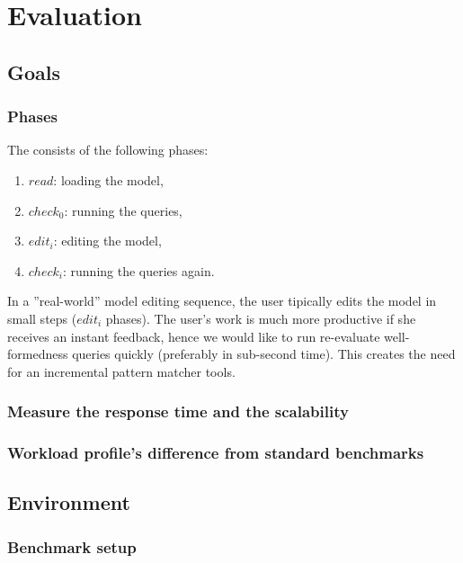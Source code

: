 \chapter{Evaluation}
\label{chap:evaluation}

\section{Goals}


\subsection{Phases}

The \tb{} consists of the following phases:

\begin{enumerate}
  \item $\mathit{read}$: loading the model,
  \item $\mathit{check}_0$: running the queries,
  \item $\mathit{edit}_i$: editing the model, 
  \item $\mathit{check}_i$: running the queries again.
\end{enumerate}

In a ''real-world'' model editing sequence, the user tipically edits the model in small steps ($\mathit{edit}_i$ phases). The user's work is much more productive if she receives an instant feedback, hence we would like to run re-evaluate well-formedness queries quickly (preferably in sub-second time). This creates the need for an incremental pattern matcher tools.

\subsection{Measure the response time and the scalability}

\subsection{Workload profile's difference from standard benchmarks}

\section{Environment}


\subsection{Benchmark setup}

